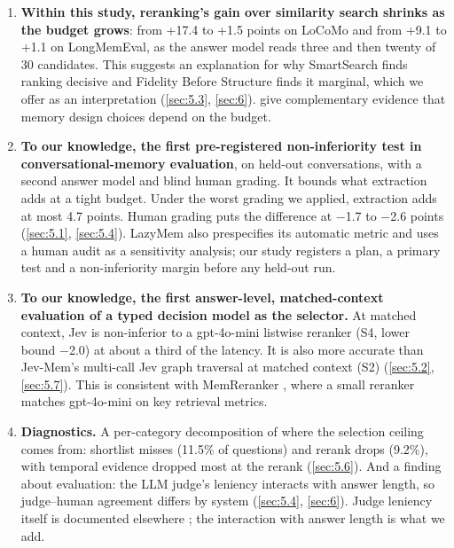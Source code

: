\documentclass[11pt]{article}
\newcommand{\src}[1]{}
\begin{document}
\begin{enumerate}
\item \textbf{Within this study, reranking's gain over similarity search shrinks as the budget grows}: from +17.4\src{bench/results/v3/batch\_a\_report.json\#fresh (T0R k3 - L0 k3)} to +1.5\src{bench/results/v3/batch\_a\_report.json\#fresh (T0R k20 - L0 k20)} points on LoCoMo and from +9.1\src{bench/results/v3/batch\_c\_report.json\#expansion (T0R 3 - L0 3)} to +1.1\src{bench/results/v3/batch\_c\_report.json\#expansion (T0R 20 - L0 20)} on LongMemEval, as the answer model reads three and then twenty of 30\src{docs/V3\_PLAN.md §1, §2, §4} candidates. This suggests an explanation for why SmartSearch finds ranking decisive and Fidelity Before Structure finds it marginal, which we offer as an interpretation (\cref{sec:5.3}, \cref{sec:6}). \citet{kang2026retain} give complementary evidence that memory design choices depend on the budget.
\item \textbf{To our knowledge, the first pre-registered non-inferiority test in conversational-memory evaluation}, on held-out conversations, with a second answer model and blind human grading. It bounds what extraction adds at a tight budget. Under the worst grading we applied, extraction adds at most 4.7\src{bench/results/v3/human\_audit/audit\_report.json\#lenient/H1\_with\_human\_grades/lower\_bound\_95\_one\_sided (negated)} points. Human grading puts the difference at $-$1.7\src{bench/results/v3/human\_audit/audit\_report.json\#strict/H1\_with\_human\_grades/d\_bar} to $-$2.6\src{bench/results/v3/human\_audit/audit\_report.json\#lenient/H1\_with\_human\_grades/d\_bar} points (\cref{sec:5.1}, \cref{sec:5.4}). LazyMem \citep{yu2026lazymem} also prespecifies its automatic metric and uses a human audit as a sensitivity analysis; our study registers a plan, a primary test and a non-inferiority margin before any held-out run.
\item \textbf{To our knowledge, the first answer-level, matched-context evaluation of a typed decision model as the selector.} At matched context, Jev is non-inferior to a gpt-4o-mini listwise reranker (S4, lower bound $-$2.0\src{bench/results/v3/batch\_b\_report.json\#S4/lower\_bound\_95\_one\_sided}) at about a third of the latency. It is also more accurate than Jev-Mem's multi-call Jev graph traversal at matched context (S2) (\cref{sec:5.2}, \cref{sec:5.7}). This is consistent with MemReranker \citep{li2026memreranker}, where a small reranker matches gpt-4o-mini on key retrieval metrics.
\item \textbf{Diagnostics.} A per-category decomposition of where the selection ceiling comes from: shortlist misses (11.5\%\src{bench/results/v3/shortlist\_recall.json\#all\_nine/all (1 - shortlist\_recall\_any)} of questions) and rerank drops (9.2\%\src{bench/results/v3/shortlist\_recall.json\#all\_nine/all (shortlist\_recall\_any x rerank\_drops\_all\_shortlisted\_evidence)}), with temporal evidence dropped most at the rerank (\cref{sec:5.6}). And a finding about evaluation: the LLM judge's leniency interacts with answer length, so judge--human agreement differs by system (\cref{sec:5.4}, \cref{sec:6}). Judge leniency itself is documented elsewhere \citep{ren2026memlens,penfield2026locomo}; the interaction with answer length is what we add.

\end{enumerate}
\end{document}
